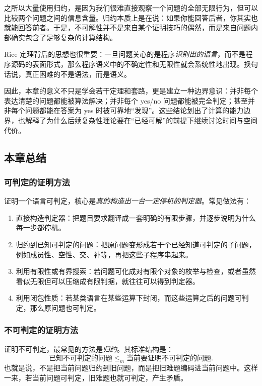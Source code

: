 之所以大量使用归约，是因为我们很难直接观察一个问题的全部无限行为，但可以比较两个问题之间的信息含量。归约本质上是在说：如果你能回答后者，你其实也就能回答前者。于是，不可解性并不是来自某个证明技巧的偶然，而是来自问题内部确实包含了足够复杂的计算结构。

Rice 定理背后的思想也很重要：一旦问题关心的是程序\emph{识别出的语言}，而不是程序源码的表面形式，那么程序语义中的不确定性和无限性就会系统性地出现。换句话说，真正困难的不是语法，而是语义。

因此，本章的意义不只是学会若干定理和套路，更是建立一种边界意识：并非每个表达清楚的问题都能被算法解决；并非每个 yes/no 问题都能被完全判定；甚至并非每个问题都能在答案为 yes 时被可靠地“发现”。这些结论划出了计算的能力边界，也解释了为什么后续复杂性理论要在“已经可解”的前提下继续讨论时间与空间代价。

\subsection*{本章总结}

\subsubsection*{可判定的证明方法}

证明一个语言可判定，核心是\emph{真的构造出一台一定停机的判定器}。常见做法有：

\begin{enumerate}[label=(\arabic*)]
  \item 直接构造判定器：把题目要求翻译成一套明确的有限步骤，并逐步说明为什么每一步都停机。
  \item 归约到已知可判定的问题：把原问题变形成若干个已经知道可判定的子问题，例如成员性、空性、交、补等，再把这些子程序串起来。
  \item 利用有限性或有界搜索：若问题可化成对有限个对象的枚举与检查，或者虽然看似无限但可以压缩成有限判据，就往往可以得到判定器。
  \item 利用闭包性质：若某类语言在某些运算下封闭，而这些运算之后的问题可判定，那么原问题也可判定。
\end{enumerate}

\subsubsection*{不可判定的证明方法}

证明不可判定，最常见的方法是\emph{归约}。其标准结构是：
\[
\text{已知不可判定的问题}
\le_m
\text{当前要证明不可判定的问题}.
\]
也就是说，不是把当前问题归约到旧问题，而是把旧难题编码进当前问题中。这样一来，若当前问题可判定，旧难题也就可判定，产生矛盾。

